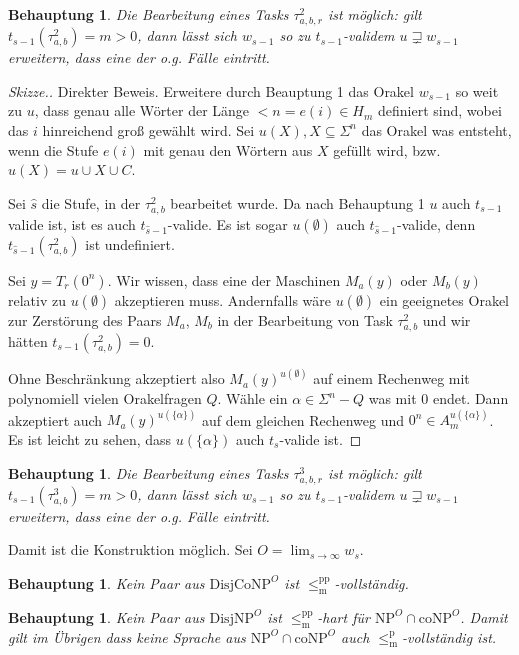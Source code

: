 \documentclass[nofonts]{uebung}
\newtheorem{claim}[theorem]{Behauptung}
\def\NP{\ensuremath{\mathrm{NP}}}
\def\DisjNP{\ensuremath{\mathrm{DisjNP}}}
\def\DisjCoNP{\ensuremath{\mathrm{DisjCoNP}}}
\def\coNP{\ensuremath{\mathrm{coNP}}}
\def\leqmpp{\ensuremath{\leq_\mathrm{m}^\mathrm{pp}}}
\def\leqmp{\ensuremath{\leq_\mathrm{m}^\mathrm{p}}}
\begin{document}
\begin{claim}
    Die Bearbeitung eines Tasks $\tau^2_{a,b,r}$ ist möglich: gilt $t_{s-1}(\tau^2_{a,b})=m>0$, dann lässt sich $w_{s-1}$ so zu $t_{s-1}$-validem $u\sqsupsetneq w_{s-1}$ erweitern, dass eine der o.g. Fälle eintritt.
\end{claim}
\begin{proof}[Skizze.]
    Direkter Beweis. %
    Erweitere durch Beauptung 1 das Orakel $w_{s-1}$ so weit zu $u$, dass genau alle Wörter der Länge $<n=e(i)\in H_m$ definiert sind, wobei das $i$ hinreichend groß gewählt wird. Sei $u(X), X\subseteq \Sigma^n$ das Orakel was entsteht, wenn die Stufe $e(i)$ mit genau den Wörtern aus $X$ gefüllt wird, bzw. $u(X)=u\cup X\cup C$.

    Sei $\hat{s}$ die Stufe, in der $\tau^2_{a,b}$ bearbeitet wurde.
    Da nach Behauptung 1 $u$ auch $t_{s-1}$ valide ist, ist es auch $t_{\hat{s}-1}$-valide.
    Es ist sogar $u(\emptyset)$ auch $t_{\hat{s}-1}$-valide, denn $t_{\hat{s}-1}(\tau^2_{a,b})$ ist undefiniert.

    Sei $y=T_r(0^n)$.
    Wir wissen, dass eine der Maschinen $M_a(y)$ oder $M_b(y)$ relativ zu $u(\emptyset)$ akzeptieren muss.
    Andernfalls wäre $u(\emptyset)$ ein geeignetes Orakel zur Zerstörung des Paars $M_a$, $M_b$ in der Bearbeitung von Task $\tau^2_{a,b}$ und wir hätten $t_{s-1}(\tau^2_{a,b})=0$.

    Ohne Beschränkung akzeptiert also $M_a(y)^{u(\emptyset)}$ auf einem Rechenweg mit polynomiell vielen Orakelfragen $Q$.
    Wähle ein $\alpha\in \Sigma^n-Q$ was mit $0$ endet. Dann akzeptiert auch $M_a(y)^{u(\{\alpha\})}$ auf dem gleichen Rechenweg und $0^n\in A_m^{u(\{\alpha\})}$. Es ist leicht zu sehen, dass $u(\{\alpha\})$ auch $t_{s}$-valide ist.
\end{proof}

\begin{claim}
    Die Bearbeitung eines Tasks $\tau^3_{a,b,r}$ ist möglich: gilt $t_{s-1}(\tau^3_{a,b})=m>0$, dann lässt sich $w_{s-1}$ so zu $t_{s-1}$-validem $u\sqsupsetneq w_{s-1}$ erweitern, dass eine der o.g. Fälle eintritt.
\end{claim}

Damit ist die Konstruktion möglich. Sei $O=\lim_{s\to\infty} w_s$.

\begin{claim}
    Kein Paar aus $\DisjCoNP^O$ ist $\leqmpp$-vollständig.
\end{claim}
\begin{claim}
    Kein Paar aus $\DisjNP^O$ ist $\leqmpp$-hart für $\NP^O\cap\coNP^O$.
    Damit gilt im Übrigen dass keine Sprache aus $\NP^O\cap\coNP^O$ auch $\leqmp$-vollständig ist.
\end{claim}
\end{document}
